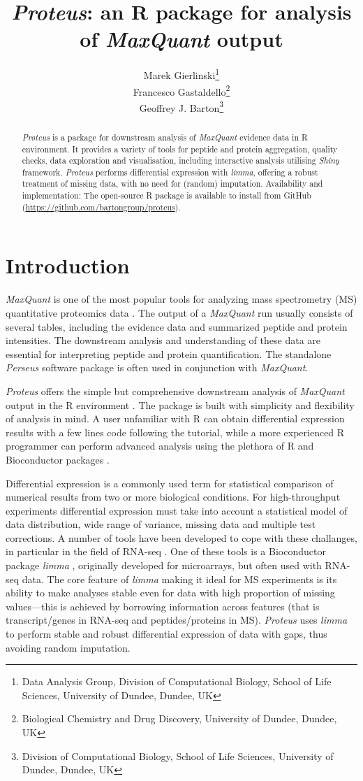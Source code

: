 \documentclass[]{article}
\title{\emph{Proteus}: an R package for analysis of \emph{MaxQuant} output}
\author{Marek Gierlinski\footnote{Data Analysis Group, Division of Computational
  Biology, School of Life Sciences, University of Dundee, Dundee, UK} \\ Francesco Gastaldello\footnote{Biological Chemistry and Drug Discovery,
  University of Dundee, Dundee, UK} \\ Geoffrey J. Barton\footnote{Division of Computational Biology, School of
  Life Sciences, University of Dundee, Dundee, UK}}
\date{}
\begin{document}
\maketitle
\begin{abstract}
\emph{Proteus} is a package for downstream analysis of \emph{MaxQuant}
evidence data in R environment. It provides a variety of tools for
peptide and protein aggregation, quality checks, data exploration and
visualisation, including interactive analysis utilising \emph{Shiny}
framework. \emph{Proteus} performs differential expression with
\emph{limma}, offering a robust treatment of missing data, with no need
for (random) imputation. Availability and implementation: The
open-source R package is available to install from GitHub
(\url{https://github.com/bartongroup/proteus}).
\end{abstract}

\section{Introduction}\label{introduction}

\emph{MaxQuant} is one of the most popular tools for analyzing mass
spectrometry (MS) quantitative proteomics data \citep{coxmann2008}. The
output of a \emph{MaxQuant} run usually consists of several tables,
including the evidence data and summarized peptide and protein
intensities. The downstream analysis and understanding of these data are
essential for interpreting peptide and protein quantification. The
standalone \emph{Perseus} software package \citep{tyanova2016} is often
used in conjunction with \emph{MaxQuant}.

\emph{Proteus} offers the simple but comprehensive downstream analysis
of \emph{MaxQuant} output in the R environment \citep{R2018}. The
package is built with simplicity and flexibility of analysis in mind. A
user unfamiliar with R can obtain differential expression results with a
few lines code following the tutorial, while a more experienced R
programmer can perform advanced analysis using the plethora of R and
Bioconductor packages \citep{bioconductor2015}.

Differential expression is a commonly used term for statistical
comparison of numerical results from two or more biological conditions.
For high-throughput experiments differential expression must take into
account a statistical model of data distribution, wide range of
variance, missing data and multiple test corrections. A number of tools
have been developed to cope with these challanges, in particular in the
field of RNA-seq \citep{gierlinski2015, schurch2016}. One of these tools
is a Bioconductor package \emph{limma} \citep{ritchie2015}, originally
developed for microarrays, but often used with RNA-seq data. The core
feature of \emph{limma} making it ideal for MS experiments is its
ability to make analyses stable even for data with high proportion of
missing values---this is achieved by borrowing information across
features (that is transcript/genes in RNA-seq and peptides/proteins in
MS). \emph{Proteus} uses \emph{limma} to perform stable and robust
differential expression of data with gaps, thus avoiding random
imputation.
\end{document}
